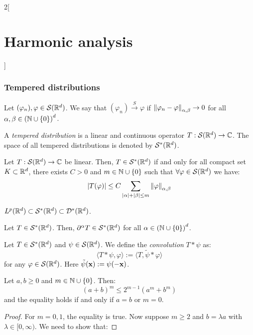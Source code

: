 \documentclass[../../../main_math.tex]{subfiles}
\begin{document}
\begin{multicols}{2}[\section{Harmonic analysis}]
  \subsubsection{Tempered distributions}
  \begin{definition}
    Let $(\varphi_n),\varphi\in\mathcal{S}(\mathbb{R}^d)$. We say that $(\varphi_n)\overset{S}{\longrightarrow}\varphi$ if $\left\|\varphi_n-\varphi\right\|_{\alpha,\beta}\to 0$ for all $\alpha,\beta\in{(\ensuremath{\mathbb{N}}\cup\{0\})}^d$.
  \end{definition}
  \begin{definition}
    A \emph{tempered distribution} is a linear and continuous operator $T:\mathcal{S}(\mathbb{R}^d)\to \mathbb{C}$. The space of all tempered distributions is denoted by $\mathcal{S}^*(\mathbb{R}^d)$.
  \end{definition}
  \begin{lemma}
    Let $T:\mathcal{S}(\mathbb{R}^d)\to \mathbb{C}$ be linear. Then, $T\in\mathcal{S}^*(\mathbb{R}^d)$ if and only for all compact set $K\subset\mathbb{R}^d$, there exists $C>0$ and $m\in\mathbb{N}\cup\{0\}$ such that $\forall \varphi\in \mathcal{S}(\mathbb{R}^d)$ we have:
    $$
      \abs{T(\varphi)}\leq C\sum_{\abs{\alpha}+\abs{\beta}\leq m}\left\|\varphi\right\|_{\alpha,\beta}
    $$
  \end{lemma}
  \begin{lemma}\label{HA:LpSD}
    $L^p(\mathbb{R}^d)\subset\mathcal{S}^*(\mathbb{R}^d)\subset \mathcal{D}^*(\mathbb{R}^d)$.
  \end{lemma}
  \begin{lemma}
    Let $T\in \mathcal{S}^*(\mathbb{R}^d)$. Then, $\partial^\alpha T\in \mathcal{S}^*(\mathbb{R}^d)$ for all $\alpha\in{(\ensuremath{\mathbb{N}}\cup\{0\})}^d$.
  \end{lemma}
  \begin{definition}
    Let $T\in \mathcal{S}^*(\mathbb{R}^d)$ and $\psi\in \mathcal{S}(\mathbb{R}^d)$. We define the \emph{convolution} $T*\psi$ as:
    $$
      \langle T*\psi,\varphi\rangle:=\langle T,\tilde\psi*\varphi\rangle
    $$
    for any $\varphi\in \mathcal{S}(\mathbb{R}^d)$. Here $\tilde\psi(\boldsymbol{\mathrm{x}}):=\psi(-\boldsymbol{\mathrm{x}})$.
  \end{definition}
  \begin{lemma}\label{HA:lemma_aMbM}
    Let $a,b\geq 0$ and $m\in\mathbb{N}\cup\{0\}$. Then:
    $$
      {(a+b)}^m\leq 2^{m-1}(a^m+b^m)
    $$
    and the equality holds if and only if $a=b$ or $m=0$.
  \end{lemma}
  \begin{proof}
    For $m=0,1$, the equality is true. Now suppose $m\geq 2$ and $b=\lambda a$ with $\lambda\in [0,\infty)$. We need to show that:

\end{proof}
\end{multicols}
\end{document}
